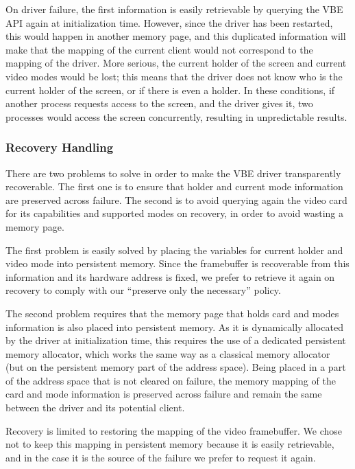 \documentclass{report}
\begin{document}
On driver failure, the first information is easily retrievable by querying the VBE API again at initialization time. However, since the driver has been restarted, this would happen in another memory page, and this duplicated information will make that the mapping of the current client would not correspond to the mapping of the driver. More serious, the current holder of the screen and current video modes would be lost; this means that the driver does not know who is the current holder of the screen, or if there is even a holder. In these conditions, if another process requests access to the screen, and the driver gives it, two processes would access the screen concurrently, resulting in unpredictable results.

\subsubsection{Recovery Handling}
There are two problems to solve in order to make the VBE driver transparently recoverable. The first one is to ensure that holder and current mode information are preserved across failure. The second is to avoid querying again the video card for its capabilities and supported modes on recovery, in order to avoid wasting a memory page.

The first problem is easily solved by placing the variables for current holder and video mode into persistent memory. Since the framebuffer is recoverable from this information and its hardware address is fixed, we prefer to retrieve it again on recovery to comply with our ``preserve only the necessary'' policy.

The second problem requires that the memory page that holds card and modes information is also placed into persistent memory. As it is dynamically allocated by the driver at initialization time, this requires the use of a dedicated persistent memory allocator, which works the same way as a classical memory allocator (but on the persistent memory part of the address space). Being placed in a part of the address space that is not cleared on failure, the memory mapping of the card and mode information is preserved across failure and remain the same between the driver and its potential client.

Recovery is limited to restoring the mapping of the video framebuffer. We chose not to keep this mapping in persistent memory because it is easily retrievable, and in the case it is the source of the failure we prefer to request it again.
\end{document}
